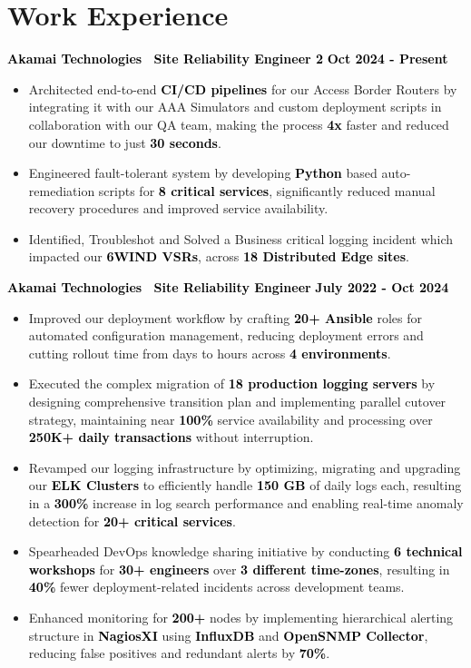 \documentclass[a4paper,10pt]{article}
\newcommand{\bb}[1]{\textcolor{black}{\textbf{#1}}}
\begin{document}
\section{Work Experience}
\bb{ Akamai Technologies \textbar\ Site Reliability Engineer 2 } \hfill \bb{Oct 2024 - Present}
\smallskip
\begin{itemize}[nosep, leftmargin=2em, itemsep=3pt]
    \item Architected end-to-end \bb{CI/CD pipelines} for our Access Border Routers by integrating it with our AAA Simulators and custom deployment scripts in collaboration with our QA team, making the process \bb{4x} faster and reduced our downtime to just \bb{30 seconds}.
    \item Engineered fault-tolerant system by developing \bb{Python} based auto-remediation scripts for \bb{8 critical services}, significantly reduced manual recovery procedures and improved service availability.
    \item Identified, Troubleshot and Solved a Business critical logging incident which impacted our \bb{6WIND VSRs}, across \bb{18 Distributed Edge sites}.
\end{itemize}
\medskip
%
\bb{ Akamai Technologies \textbar\ Site Reliability Engineer } \hfill \bb{July 2022 - Oct 2024}
\smallskip
\begin{itemize}[nosep, leftmargin=2em, itemsep=3pt]
    \item Improved our deployment workflow by crafting \bb{20+ Ansible} roles for automated configuration management, reducing deployment errors and cutting rollout time from days to hours across \bb{4 environments}.
    \item Executed the complex migration of \bb{18 production logging servers} by designing comprehensive transition plan and implementing parallel cutover strategy, maintaining near \bb{100\%} service availability and processing over \bb{250K+ daily transactions} without interruption.
    \item Revamped our logging infrastructure by optimizing, migrating and upgrading our \bb{ELK Clusters} to efficiently handle \bb{150 GB} of daily logs each, resulting in a \bb{300\%} increase in log search performance and enabling real-time anomaly detection for \bb{20+ critical services}.
    \item Spearheaded DevOps knowledge sharing initiative by conducting \bb{6 technical workshops} for \bb{30+ engineers} over \bb{3 different time-zones}, resulting in \bb{40\%} fewer deployment-related incidents across development teams.
    \item Enhanced monitoring for \bb{200+} nodes by implementing hierarchical alerting structure in \bb{NagiosXI} using \bb{InfluxDB} and \bb{OpenSNMP Collector}, reducing false positives and redundant alerts by \bb{70\%}.
\end{itemize}
\vspace{-1em}
%
%
\end{document}
